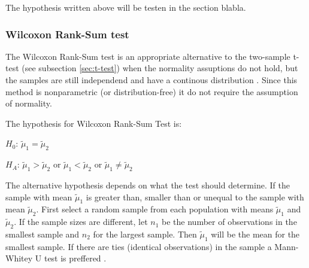 The hypothesis written above will be testen in the section blabla. %



\subsubsection[Wilcoxon]{Wilcoxon Rank-Sum test}\label{sec:Wilcoxon}
The Wilcoxon Rank-Sum test is an appropriate alternative to the two-sample t-test (see subsection \ref{sec:t-test}) when the normality assuptions do not hold, but the samples are still independend and have a continous distribution \citep{Walpole2012}. Since this method is nonparametric (or distribution-free) it do not require the assumption of normality. 

The hypothesis for Wilcoxon Rank-Sum Test is:\newline

\centerline{$H_{0}$:  $\tilde{\mu}_{1} =  \tilde{\mu}_{2} $} 
\centerline{$H_{A}$: $\tilde{\mu}_{1} >  \tilde{\mu}_{2} $ or $\tilde{\mu}_{1} <  \tilde{\mu}_{2} $ or $\tilde{\mu}_{1} \neq  \tilde{\mu}_{2} $}

The alternative hypothesis depends on what the test should determine. If the sample with mean $\tilde{\mu}_1$ is greater than, smaller than or unequal to the sample with mean $\tilde{\mu}_2$.  First select a random sample from each population with means $\tilde{\mu}_{1} $ and $ \tilde{\mu}_{2} $. If the sample sizes are different, let $n_{1}$ be the number of observations in the smallest sample and $n_{2}$ for the largest sample. Then $\tilde{\mu}_1$ will be the mean for the smallest sample. If there are ties (identical observations) in the sample a Mann-Whitey U test is preffered \citep{TheScipycommunity2017}. 

